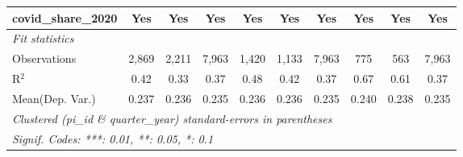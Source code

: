 \begin{tabular}{lccccccccc}
   covid\_share\_2020                                          & Yes         & Yes           & Yes           & Yes      & Yes        & Yes           & Yes           & Yes           & Yes\\  
   \midrule
   \emph{Fit statistics}\\
   Observations                                                & 2,869       & 2,211         & 7,963         & 1,420    & 1,133      & 7,963         & 775           & 563           & 7,963\\  
   R$^2$                                                       & 0.42        & 0.33          & 0.37          & 0.48     & 0.42       & 0.37          & 0.67          & 0.61          & 0.37\\  
Mean(Dep. Var.) & 0.237 & 0.236 & 0.235 & 0.236 & 0.236 & 0.235 & 0.240 & 0.238 & 0.235 \\
   \midrule \midrule
   \multicolumn{10}{l}{\emph{Clustered (pi\_id \& quarter\_year) standard-errors in parentheses}}\\
   \multicolumn{10}{l}{\emph{Signif. Codes: ***: 0.01, **: 0.05, *: 0.1}}\\
\end{tabular}
\par\endgroup

